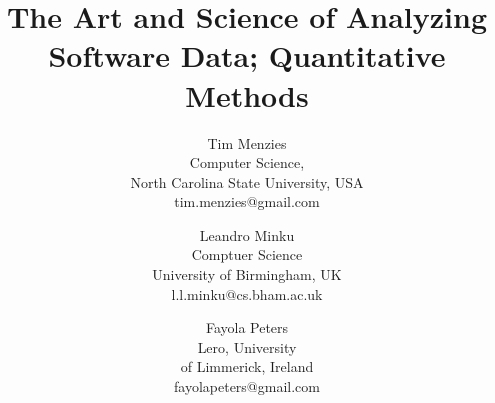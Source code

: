 \documentclass[conference]{IEEEtran}
\begin{document}
%
\title{The Art and Science of Analyzing Software Data; Quantitative Methods}




% 
\author{%
Tim Menzies\\
Computer Science, \\
North Carolina State University, USA\\
tim.menzies@gmail.com
\and
 Leandro Minku\\
Comptuer Science\\
University of Birmingham, UK\\
l.l.minku@cs.bham.ac.uk
\and
Fayola Peters\\
Lero, University \\of Limmerick, Ireland\\
fayolapeters@gmail.com
}




\end{document}
